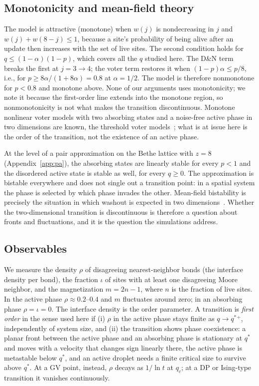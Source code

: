 \documentclass[pre,twocolumn,superscriptaddress,showpacs,floatfix]{revtex4-2}
\newcommand{\qs}{q^{*}}
\begin{document}
\subsection{Monotonicity and mean-field theory}
\label{sec:mf}

The model is attractive (monotone) when $w(j)$ is nondecreasing in $j$ and $w(j)+w(8-j)\le 1$,
because a site's probability of being alive after an update then increases with the set of live
sites. The second condition holds for $q\le(1-\alpha)(1-p)$, which covers all the $q$ studied
here. The D\&N term breaks the first at $j = 3\to 4$; the voter term restores it when
$(1-p)\alpha \le p/8$, i.e., for $p\ge 8\alpha/(1+8\alpha) = 0.8$ at $\alpha = 1/2$. The model is therefore nonmonotone for
$p<0.8$ and monotone above. None of our arguments uses monotonicity; we note it because the
first-order line extends into the monotone region, so nonmonotonicity is not what makes the
transition discontinuous. Monotone nonlinear voter models with two absorbing states and a
noise-free active phase in two dimensions are known, the threshold voter
models~\cite{liggett1994}; what is at issue here is the order of the transition, not the
existence of an active phase.

At the level of a pair approximation on the Bethe lattice with $z = 8$ (Appendix~\ref{app:pa}),
the absorbing states are linearly stable for every $p<1$ and the disordered active state is
stable as well, for every $q\ge 0$. The approximation is bistable everywhere and does not single
out a transition point: in a spatial system the phase is selected by which phase invades the
other. Mean-field bistability is precisely the situation in which washout is expected in two
dimensions~\cite{castellano2009}. Whether the two-dimensional transition is discontinuous is
therefore a question about fronts and fluctuations, and it is the question the simulations
address.

\subsection{Observables}

We measure the density $\rho$ of disagreeing nearest-neighbor bonds (the interface density per
bond), the fraction $\iota$ of sites with at least one disagreeing Moore neighbor, and the
magnetization $m = 2n-1$, where $n$ is the fraction of live sites. In the active phase
$\rho\approx 0.2$--$0.4$ and $m$ fluctuates around zero; in an absorbing phase $\rho = \iota = 0$.
The interface density is the order parameter. A transition is \emph{first order} in the sense
used here if (i) $\rho$ in the active phase stays finite as $q\to\qs{}^+$, independently of
system size, and (ii) the transition shows phase coexistence: a planar front between the active
phase and an absorbing phase is stationary at $\qs$ and moves with a velocity that changes sign
linearly there, the active phase is metastable below $\qs$, and an active droplet needs a finite
critical size to survive above $\qs$. At a GV point, instead, $\rho$ decays as $1/\ln t$ at
$q_c$; at a DP or Ising-type transition it vanishes continuously.
\end{document}
